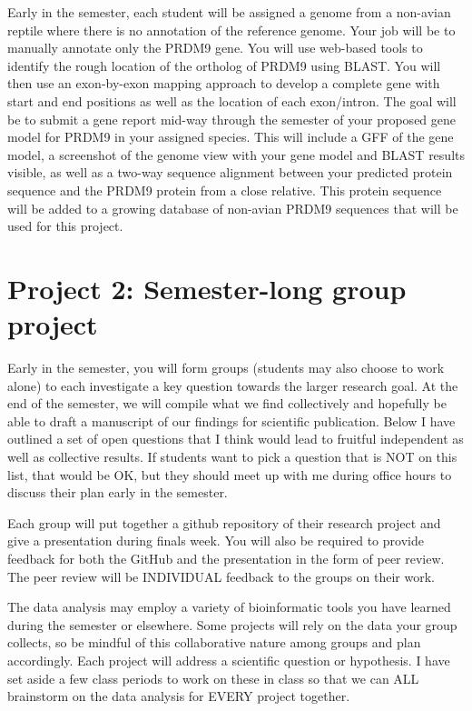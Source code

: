 \documentclass[
  letterpaper,
  DIV=11,
  numbers=noendperiod]{scrreprt}
\begin{document}
Early in the semester, each student will be assigned a genome from a
non-avian reptile where there is no annotation of the reference genome.
Your job will be to manually annotate only the PRDM9 gene. You will use
web-based tools to identify the rough location of the ortholog of PRDM9
using BLAST. You will then use an exon-by-exon mapping approach to
develop a complete gene with start and end positions as well as the
location of each exon/intron. The goal will be to submit a gene report
mid-way through the semester of your proposed gene model for PRDM9 in
your assigned species. This will include a GFF of the gene model, a
screenshot of the genome view with your gene model and BLAST results
visible, as well as a two-way sequence alignment between your predicted
protein sequence and the PRDM9 protein from a close relative. This
protein sequence will be added to a growing database of non-avian PRDM9
sequences that will be used for this project.

\section{Project 2: Semester-long group
project}\label{project-2-semester-long-group-project}

Early in the semester, you will form groups (students may also choose to
work alone) to each investigate a key question towards the larger
research goal. At the end of the semester, we will compile what we find
collectively and hopefully be able to draft a manuscript of our findings
for scientific publication. Below I have outlined a set of open
questions that I think would lead to fruitful independent as well as
collective results. If students want to pick a question that is NOT on
this list, that would be OK, but they should meet up with me during
office hours to discuss their plan early in the semester.

Each group will put together a github repository of their research
project and give a presentation during finals week. You will also be
required to provide feedback for both the GitHub and the presentation in
the form of peer review. The peer review will be INDIVIDUAL feedback to
the groups on their work.

The data analysis may employ a variety of bioinformatic tools you have
learned during the semester or elsewhere. Some projects will rely on the
data your group collects, so be mindful of this collaborative nature
among groups and plan accordingly. Each project will address a
scientific question or hypothesis. I have set aside a few class periods
to work on these in class so that we can ALL brainstorm on the data
analysis for EVERY project together.
\end{document}

